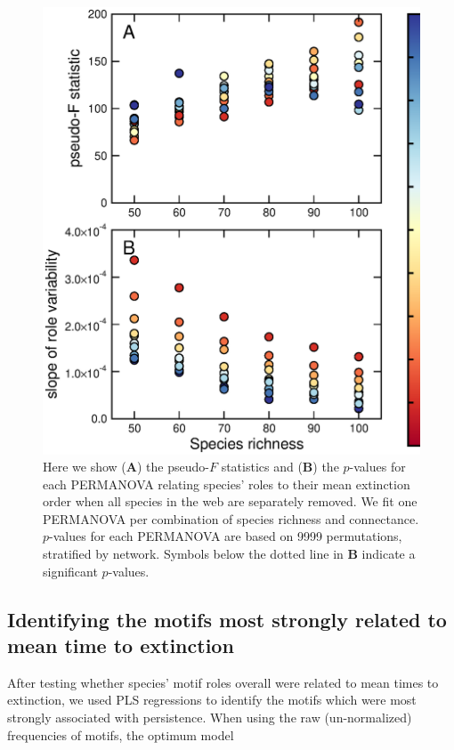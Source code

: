 \documentclass[12pt]{article}
\begin{document}
      \begin{figure}[hb!]
        \caption{Here we show (\textbf{A}) the pseudo-$F$ statistics and (\textbf{B}) the $p$-values for each PERMANOVA relating species' roles to their mean extinction order when all species in the web are separately removed. We fit one PERMANOVA per combination of species richness and connectance. $p$-values for each PERMANOVA are based on 9999 permutations, stratified by network. Symbols below the dotted line in \textbf{B} indicate a significant $p$-values.}
        \label{permfig}
        \includegraphics[height=.5\textheight]{figures/extinction_order/permanova_summary_paper_full.eps}
        \end{figure}




  \subsection*{Identifying the motifs most strongly related to mean time to extinction}

        After testing whether species' motif roles overall were related to mean times to extinction, we used PLS regressions to identify the motifs which were most strongly associated with persistence. 
        When using the raw (un-normalized) frequencies of motifs, the optimum model 
        
\end{document}
